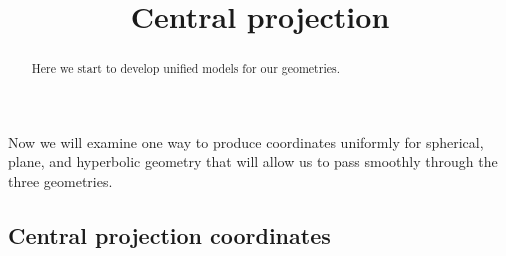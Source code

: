 \documentclass[newpage,hints,handout,12pt,noauthor,nooutcomes]{ximera}
\title{Central projection}
\begin{document}
\begin{abstract}
Here we start to develop unified models for our geometries.
\end{abstract}
\maketitle

Now we will examine one way to produce coordinates uniformly for
spherical, plane, and hyperbolic geometry that will allow us to pass
smoothly through the three geometries.


\subsection{Central projection coordinates}
\end{document}
